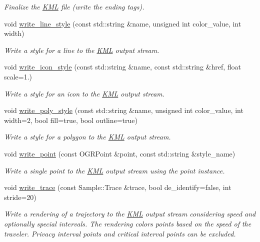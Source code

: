 \begin{DoxyCompactItemize}
\begin{DoxyCompactList}\small\item\em Finalize the \hyperlink{classgeo__data_1_1KML}{K\+ML} file (write the ending tags). \end{DoxyCompactList}\item 
void \hyperlink{classgeo__data_1_1KML_a52c966b02495f51aac7cbe9ca99a2eec}{write\+\_\+line\+\_\+style} (const std\+::string \&name, unsigned int color\+\_\+value, int width)
\begin{DoxyCompactList}\small\item\em Write a style for a line to the \hyperlink{classgeo__data_1_1KML}{K\+ML} output stream. \end{DoxyCompactList}\item 
void \hyperlink{classgeo__data_1_1KML_a68d10daf35e4c43f024e3e2d2bc44bf2}{write\+\_\+icon\+\_\+style} (const std\+::string \&name, const std\+::string \&href, float scale=1.)
\begin{DoxyCompactList}\small\item\em Write a style for an icon to the \hyperlink{classgeo__data_1_1KML}{K\+ML} output stream. \end{DoxyCompactList}\item 
void \hyperlink{classgeo__data_1_1KML_a2a7e4010226e316d630837ec1f37f7c3}{write\+\_\+poly\+\_\+style} (const std\+::string \&name, unsigned int color\+\_\+value, int width=2, bool fill=true, bool outline=true)
\begin{DoxyCompactList}\small\item\em Write a style for a polygon to the \hyperlink{classgeo__data_1_1KML}{K\+ML} output stream. \end{DoxyCompactList}\item 
void \hyperlink{classgeo__data_1_1KML_a022fed3d67ebd03e5e8b04e27b21ceaf}{write\+\_\+point} (const O\+G\+R\+Point \&point, const std\+::string \&style\+\_\+name)
\begin{DoxyCompactList}\small\item\em Write a single point to the \hyperlink{classgeo__data_1_1KML}{K\+ML} output stream using the point instance. \end{DoxyCompactList}\item 
void \hyperlink{classgeo__data_1_1KML_afce06a5440ba520d2197933c37edc931}{write\+\_\+trace} (const Sample\+::\+Trace \&trace, bool de\+\_\+identify=false, int stride=20)
\begin{DoxyCompactList}\small\item\em Write a rendering of a trajectory to the \hyperlink{classgeo__data_1_1KML}{K\+ML} output stream considering speed and optionally special intervals. The rendering colors points based on the speed of the traveler. Privacy interval points and critical interval points can be excluded. \end{DoxyCompactList}\item 

\end{DoxyCompactItemize}
